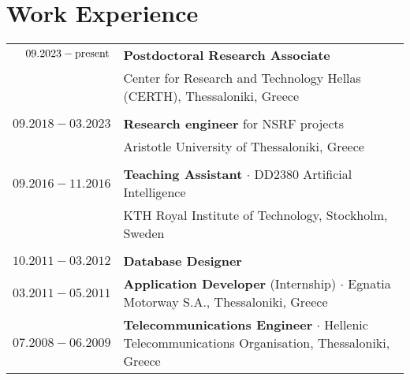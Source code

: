 \documentclass[a4paper,10pt,twoside]{article}
\begin{document}


\par{\bigskip\par}



\section{Work Experience}

\begin{tabular}{rp{12cm}}
$09.2023 - \hfill \textnormal{present} \hfill$ & \textbf{Postdoctoral Research Associate} \\
                    & Center for Research and Technology Hellas (CERTH), Thessaloniki, Greece\\
&\\
$09.2018 - 03.2023$ & \textbf{Research engineer} for NSRF projects\\
                    & Aristotle University of Thessaloniki, Greece\\
&\\
$09.2016 - 11.2016$ & \textbf{Teaching Assistant} $\cdot$ DD2380 Artificial Intelligence\\
                    & KTH Royal Institute of Technology, Stockholm, Sweden\\
&\\
$10.2011 - 03.2012$ & \textbf{Database Designer}\\
$03.2011 - 05.2011$ & \textbf{Application Developer} (Internship) $\cdot$ Egnatia Motorway S.A., Thessaloniki, Greece\\
$07.2008 - 06.2009$ & \textbf{Telecommunications Engineer} $\cdot$ Hellenic Telecommunications Organisation, Thessaloniki, Greece\\
\end{tabular} \\
\end{document}
